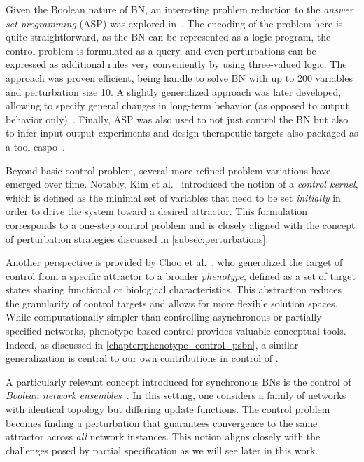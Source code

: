 Given the Boolean nature of BN, an interesting problem reduction to the \emph{answer set programming} (ASP) was explored in~\cite{Kaminski2013}. The encoding of the problem here is quite straightforward, as the BN can be represented as a logic program, the control problem is formulated as a query, and even perturbations can be expressed as additional rules very conveniently by using three-valued logic. The approach was proven efficient, being handle to solve BN with up to 200 variables and perturbation size 10. A slightly generalized approach was later developed, allowing to specify general changes in long-term behavior (as opposed to output behavior only)~\cite{Videla2014}. Finally, ASP was also used to not just control the BN but also to infer input-output experiments and design therapeutic targets also packaged as a tool caspo~\cite{Videla2017}.

Beyond basic control problem, several more refined problem variations have emerged over time. Notably, Kim et al.~\cite{Kim2013} introduced the notion of a \emph{control kernel}, which is defined as the minimal set of variables that need to be set \emph{initially} in order to drive the system toward a desired attractor. This formulation corresponds to a one-step control problem and is closely aligned with the concept of perturbation strategies discussed in \autoref{subsec:perturbations}. 

Another perspective is provided by Choo et al.~\cite{Choo2018}, who generalized the target of control from a specific attractor to a broader \emph{phenotype}, defined as a set of target states sharing functional or biological characteristics. This abstraction reduces the granularity of control targets and allows for more flexible solution spaces. While computationally simpler than controlling asynchronous or partially specified networks, phenotype-based control provides valuable conceptual tools. Indeed, as discussed in \autoref{chapter:phenotype_control_psbn}, a similar generalization is central to our own contributions in control of \PBN{}.

A particularly relevant concept introduced for synchronous BNs is the control of \emph{Boolean network ensembles}~\cite{Gates2016,Correia2018,Gates2021,Videla2017}. In this setting, one considers a family of networks with identical topology but differing update functions. The control problem becomes finding a perturbation that guarantees convergence to the same attractor across \emph{all} network instances. This notion aligns closely with the challenges posed by partial specification as we will see later in this work.

